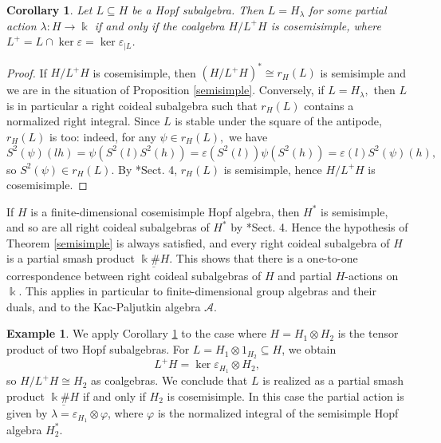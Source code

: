 \documentclass[reqno]{amsart}
\newtheorem{cor}[thm]{Corollary}
\theoremstyle{definition}
\newtheorem{exa}[thm]{Example}
\numberwithin{equation}{section}\theoremstyle{plain}
\theoremstyle{definition}
\def \k {\Bbbk}
\def \A {\mathcal{A}}
\begin{document}
    \begin{cor}
    \label{cor:cosemi}
        Let \(L \subseteq H\) be a Hopf subalgebra. Then \(L = H_\lambda\) for some partial action \(\lambda : H \to \k\) if and only if the coalgebra \(H/L^+ H\) is cosemisimple, where \(L^+ = L \cap \ker \varepsilon = \ker \varepsilon_{|L}\).
    \end{cor}
    \begin{proof}
        If \(H/L^+H\) is cosemisimple, then \((H/L^+H)^* \cong r_H(L)\) is semisimple and we are in the situation of Proposition \ref{semisimple}.
        Conversely, if \(L = H_\lambda,\) then \(L\) is in particular a right coideal subalgebra such that \(r_H(L)\) contains a normalized right integral. Since \(L\) is stable under the square of the antipode, \(r_H(L)\) is too: indeed, for any \(\psi \in r_H(L),\)
        we have
        \[S^2(\psi)(lh) = \psi(S^2(l)S^2(h)) = \varepsilon(S^2(l)) \psi(S^2(h)) = \varepsilon(l) S^2(\psi)(h), \]
        so \(S^2(\psi) \in r_H(L)\). By \cite{Frobenius}*{Sect. 4}, \(r_H(L)\) is semisimple, hence \(H/L^+ H\) is cosemisimple. 
    \end{proof}

    If \(H\) is a finite-dimensional cosemisimple Hopf algebra, then \(H^*\) is semisimple, and so are all right coideal subalgebras of \(H^*\) by \cite{Frobenius}*{Sect. 4}. Hence the hypothesis of Theorem \ref{semisimple} is always satisfied, and every right coideal subalgebra of \(H\) is a partial smash product \(\underline{\k \# H}\). This shows that there is a one-to-one correspondence between right coideal subalgebras of \(H\) and partial \(H\)-actions on \(\k\). This applies in particular to finite-dimensional group algebras and their duals, and to the Kac-Paljutkin algebra \(\A\).


    \begin{exa}
        We apply Corollary \ref{cor:cosemi} to the case where \(H = H_1 \otimes H_2\) is the tensor product of two Hopf subalgebras. For \(L = H_1 \otimes 1_{H_2} \subseteq H\), we obtain
        \[L^+ H = \ker \varepsilon_{H_1} \otimes H_2,\]
        so \(H/L^+ H \cong H_2\) as coalgebras. We conclude that \(L\) is realized as a partial smash product \(\underline{\Bbbk \# H}\) if and only if \(H_2\) is cosemisimple. In this case the partial action is given by \(\lambda = \varepsilon_{H_1} \otimes \varphi\), where \(\varphi\) is the normalized integral of the semisimple Hopf algebra \(H_2^*\).
    \end{exa}
\end{document}

